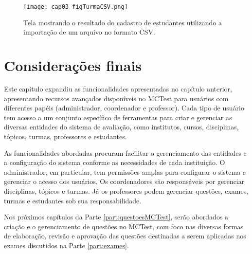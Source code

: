 \begin{figure}[!ht]
  \centering
  \texttt{[image: cap03\_figTurmaCSV.png]}
  \caption{Tela mostrando o resultado do cadastro de estudantes utilizando a importação de um arquivo no formato CSV.}
  \label{fig:cap03_figTurmaCSV}
\end{figure}

\section{Considerações finais}

Este capítulo expandiu as funcionalidades apresentadas no capítulo anterior, apresentando recursos avançados disponíveis no MCTest para usuários com diferentes papéis (administrador, coordenador e professor). Cada tipo de usuário tem acesso a um conjunto específico de ferramentas para criar e gerenciar as diversas entidades do sistema de avaliação, como institutos, cursos, disciplinas, tópicos, turmas, professores e estudantes.

As funcionalidades abordadas procuram facilitar o gerenciamento das entidades e a configuração do sistema conforme as necessidades de cada instituição. O administrador, em particular, tem permissões amplas para configurar o sistema e gerenciar o acesso dos usuários. Os coordenadores são responsáveis por gerenciar disciplinas, tópicos e turmas. Já os professores podem gerenciar questões, exames, turmas e estudantes sob sua responsabilidade.

Nos próximos capítulos da Parte \ref{part:questoesMCTest}, serão abordados a criação e o gerenciamento de questões no MCTest, com foco nas diversas formas de elaboração, revisão e aprovação das questões destinadas a serem aplicadas nos exames discutidos na Parte \ref{part:exames}.
